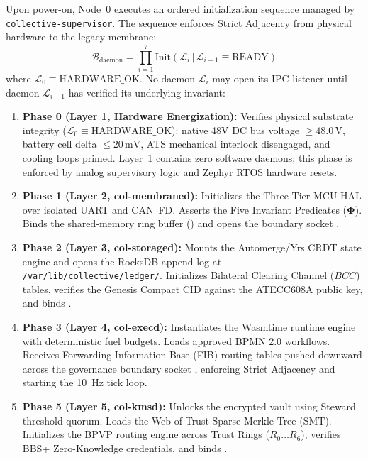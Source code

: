 Upon power-on, Node~0 executes an ordered initialization sequence managed by \texttt{collective\allowbreak-supervisor}. The sequence enforces Strict Adjacency from physical hardware to the legacy membrane:
\begin{equation}
\mathcal{B}_{\mathrm{daemon}} = \prod_{i=1}^{7} \mathrm{Init}\left(\mathcal{L}_i \,|\, \mathcal{L}_{i-1} \equiv \mathrm{READY}\right)
\label{eq:daemon_bootstrap_invariant}
\end{equation}
where $\mathcal{L}_0 \equiv \mathrm{HARDWARE\_OK}$. No daemon $\mathcal{L}_i$ may open its IPC listener until daemon $\mathcal{L}_{i-1}$ has verified its underlying invariant:
\begin{enumerate}
    \item \textbf{Phase 0 (Layer 1, Hardware Energization):} Verifies physical substrate integrity ($\mathcal{L}_0 \equiv \mathrm{HARDWARE\_OK}$): native 48V DC bus voltage $\ge 48.0\,\mathrm{V}$, battery cell delta $\le 20\,\mathrm{mV}$, ATS mechanical interlock disengaged, and cooling loops primed. Layer~1 contains zero software daemons; this phase is enforced by analog supervisory logic and Zephyr RTOS hardware resets.
    \item \textbf{Phase 1 (Layer 2, col-membraned):} Initializes the Three-Tier MCU HAL over isolated UART and CAN~FD. Asserts the Five Invariant Predicates ($\mathbf{\Phi}$). Binds the shared-memory ring buffer () and opens the boundary socket .
    \item \textbf{Phase 2 (Layer 3, col-storaged):} Mounts the Automerge/Yrs CRDT state engine and opens the RocksDB append-log at \texttt{/var/lib/}\allowbreak\texttt{collective/}\allowbreak\texttt{ledger/}. Initializes Bilateral Clearing Channel ($BCC$) tables, verifies the Genesis Compact CID against the ATECC608A public key, and binds .
    \item \textbf{Phase 3 (Layer 4, col-execd):} Instantiates the Wasmtime runtime engine with deterministic fuel budgets. Loads approved BPMN 2.0 workflows. Receives Forwarding Information Base (FIB) routing tables pushed downward across the governance boundary socket , enforcing Strict Adjacency and starting the 10~Hz tick loop.
    \item \textbf{Phase 5 (Layer 5, col-kmsd):} Unlocks the encrypted vault using Steward threshold quorum. Loads the Web of Trust Sparse Merkle Tree (SMT). Initializes the BPVP routing engine across Trust Rings ($R_0 \dots R_6$), verifies BBS+ Zero-Knowledge credentials, and binds .

\end{enumerate}
